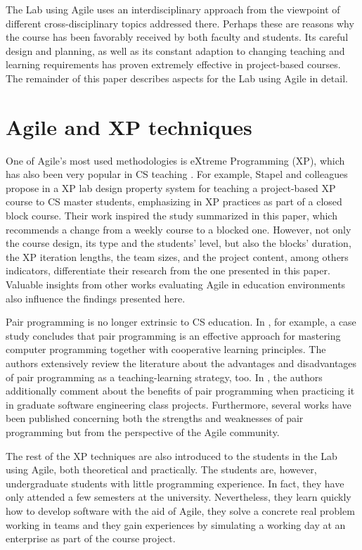 \documentclass[conference]{IEEEtran}
\begin{document}
The Lab using Agile uses an interdisciplinary approach from the viewpoint of different cross-disciplinary topics addressed there. Perhaps these are reasons why the course has been favorably received by both faculty and students. Its careful design and planning, as well as its constant adaption to changing teaching and learning requirements has proven extremely effective in project-based courses. The remainder of this paper describes aspects for the Lab using Agile in detail.


\section{Agile and XP techniques}
\label{sec:agileXP}

One of Agile's most used methodologies is eXtreme Programming (XP), which has also been very popular in CS teaching \cite{Go04,KeDi04,MuTi01,ShWi02,StLuEr08}. For example, Stapel and colleagues propose in \cite{StLuEr08} a XP lab design property system for teaching a project-based XP course to CS master students, emphasizing in XP practices as part of a closed block course. Their work inspired the study summarized in this paper, which recommends a change from a weekly course to a blocked one. However, not only the course design, its type and the students' level, but also the blocks' duration, the XP iteration lengths, the team sizes, and the project content, among others indicators, differentiate their research from the one presented in this paper. Valuable insights from other works evaluating Agile in education environments also influence the findings presented here.

Pair programming is no longer extrinsic to CS education. In \cite{MeVaGo08}, for example, a case study concludes that pair programming is an effective approach for mastering computer programming together with cooperative learning principles. The authors extensively review the literature about the advantages and disadvantages of pair programming as a teaching-learning strategy, too. In \cite{XuRa05}, the authors additionally comment about the benefits of pair programming when practicing it in graduate software engineering class projects. Furthermore, several works have been published concerning both the strengths and weaknesses of pair programming but from the perspective of the Agile community.

The rest of the XP techniques are also introduced to the students in the Lab using Agile, both theoretical and practically. The students are, however, undergraduate students with little programming experience. In fact, they have only attended a few semesters at the university. Nevertheless, they learn quickly how to develop software with the aid of Agile, they solve a concrete real problem working in teams and they gain experiences by simulating a working day at an enterprise as part of the course project. 
\end{document}
